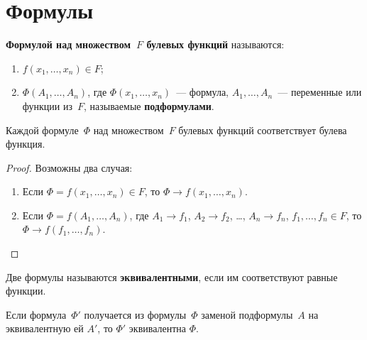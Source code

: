 \section{Формулы}
 \textbf{Формулой над множеством~$F$ булевых функций} называются:
\begin{enumerate}
	\item $f(x_1, \ldots, x_n) \in F$;
	\item $\Phi(A_1, \ldots, A_n)$, где $\Phi(x_1, \ldots, x_n)$~--- формула, $A_1, \ldots, A_n$~--- переменные или функции из~$F$, называемые \textbf{подформулами}.
\end{enumerate}

\begin{statement}
Каждой формуле~$\Phi$ над множеством~$F$ булевых функций соответствует булева функция.
\end{statement}
\begin{proof}
Возможны два случая:
\begin{enumerate}
	\item Если $\Phi = f(x_1, \ldots, x_n) \in F$, то $\Phi \to f(x_1, \ldots, x_n)$.
	\item Если $\Phi = f(A_1, \ldots, A_n)$, где $A_1 \to f_1$, $A_2 \to f_2$, \ldots, $A_n \to f_n$, $f_1, \ldots, f_n \in F$, то $\Phi \to f(f_1, \ldots, f_n)$.
\end{enumerate}
\end{proof}

Две формулы называются \textbf{эквивалентными}, если им соответствуют равные функции.

\begin{statement}
Если формула~$\Phi'$ получается из формулы~$\Phi$ заменой подформулы~$A$ на эквивалентную ей $A'$, то $\Phi'$ эквивалентна $\Phi$.
\end{statement}